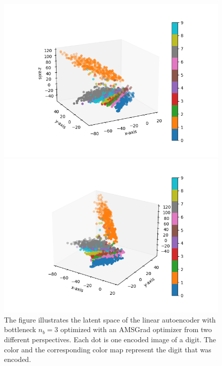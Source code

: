 \begin{figure}
\begin{center}
   \begin{minipage}[b]{0.49\linewidth}
      \includegraphics[trim = 20mm 10mm 20mm 10mm, clip, width=\linewidth]{linear_AE_3d_amsgrad_latent_1}
	\end{minipage}
   \begin{minipage}[b]{0.49\linewidth}
      \includegraphics[trim = 20mm 10mm 20mm 10mm, clip, width=\linewidth]{linear_AE_3d_amsgrad_latent_2}
	\end{minipage}
\end{center}
\caption{The figure illustrates the latent space of the linear autoencoder with bottleneck $n_b=3$ optimized with an AMSGrad optimizer from two different perspectives. Each dot is one encoded image of a digit. The color and the corresponding color map represent the digit that was encoded.}\label{fig:linear_AE_3d_amsgrad_latent}
\end{figure}


